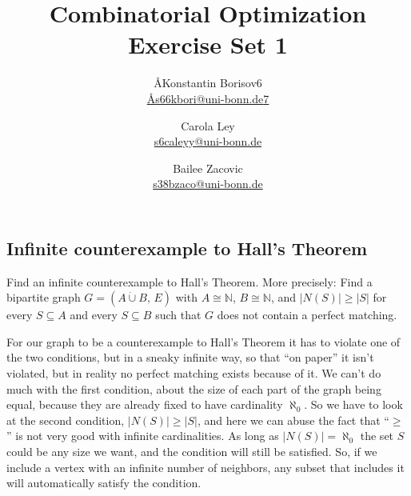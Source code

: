 \documentclass{article}
\title{Combinatorial Optimization \\ Exercise Set 1}
\author{
  \AA{Konstantin Borisov}{6} \\
  \href{mailto:\AA{s66kbori@uni-bonn.de}{7}}{\AA{s66kbori@uni-bonn.de}{7}}
  \and
  Carola Ley \\
  \href{mailto:s6caleyy@uni-bonn.de}{s6caleyy@uni-bonn.de}
  \and
  Bailee Zacovic \\
  \href{mailto:s38bzaco@uni-bonn.de}{s38bzaco@uni-bonn.de}
}
\newcommand{\N}{\mathbb{N}}
\begin{document}
  \maketitle

  \setcounter{section}{1}
  \subsection{Infinite counterexample to Hall's Theorem}
  \begin{centerframebox}
    Find an infinite counterexample to Hall's Theorem. More precisely:
    Find a bipartite graph $G = (A \dot\cup B,\, E)$ with $A \cong \N$, $B \cong \N$, and $|N(S)| \geq |S|$ for
    every $S \subseteq A$ and every $S \subseteq B$ such that $G$ does not contain a perfect matching.
  \end{centerframebox}

  For our graph to be a counterexample to Hall's Theorem it has to violate one of the two conditions,
  but in a sneaky infinite way, so that ``on paper'' it isn't violated, but in reality no perfect matching exists because of it.
  We can't do much with the first condition, about the size of each part of the graph being equal,
  because they are already fixed to have cardinality $\aleph_0$.
  So we have to look at the second condition, $|N(S)| \geq |S|$,
  and here we can abuse the fact that ``$\geq$'' is not very good with infinite cardinalities.
  As long as $|N(S)| = \aleph_0$ the set $S$ could be any size we want, and the condition will still be satisfied.
  So, if we include a vertex with an infinite number of neighbors, any subset that includes it will automatically satisfy the condition.

  \begin{center}
  \end{center}
\end{document}
